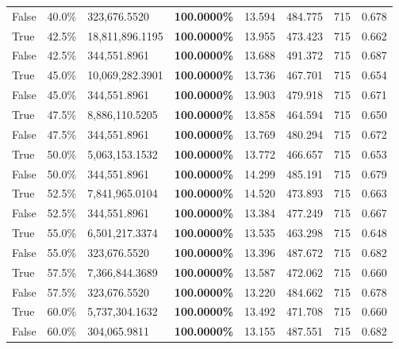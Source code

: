 \begin{table}[H]
\begin{tabular}{lllrllll}
\cline{1-8}
False & 40.0\% & 323,676.5520 & \bfseries \color{red} 100.0000\% & 13.594 & 484.775 & 715 & 0.678 \\
\cline{1-8}
True & 42.5\% & 18,811,896.1195 & \bfseries \color{red} 100.0000\% & 13.955 & 473.423 & 715 & 0.662 \\
\cline{1-8}
False & 42.5\% & 344,551.8961 & \bfseries \color{red} 100.0000\% & 13.688 & 491.372 & 715 & 0.687 \\
\cline{1-8}
True & 45.0\% & 10,069,282.3901 & \bfseries \color{red} 100.0000\% & 13.736 & 467.701 & 715 & 0.654 \\
\cline{1-8}
False & 45.0\% & 344,551.8961 & \bfseries \color{red} 100.0000\% & 13.903 & 479.918 & 715 & 0.671 \\
\cline{1-8}
True & 47.5\% & 8,886,110.5205 & \bfseries \color{red} 100.0000\% & 13.858 & 464.594 & 715 & 0.650 \\
\cline{1-8}
False & 47.5\% & 344,551.8961 & \bfseries \color{red} 100.0000\% & 13.769 & 480.294 & 715 & 0.672 \\
\cline{1-8}
True & 50.0\% & 5,063,153.1532 & \bfseries \color{red} 100.0000\% & 13.772 & 466.657 & 715 & 0.653 \\
\cline{1-8}
False & 50.0\% & 344,551.8961 & \bfseries \color{red} 100.0000\% & 14.299 & 485.191 & 715 & 0.679 \\
\cline{1-8}
True & 52.5\% & 7,841,965.0104 & \bfseries \color{red} 100.0000\% & 14.520 & 473.893 & 715 & 0.663 \\
\cline{1-8}
False & 52.5\% & 344,551.8961 & \bfseries \color{red} 100.0000\% & 13.384 & 477.249 & 715 & 0.667 \\
\cline{1-8}
True & 55.0\% & 6,501,217.3374 & \bfseries \color{red} 100.0000\% & 13.535 & 463.298 & 715 & 0.648 \\
\cline{1-8}
False & 55.0\% & 323,676.5520 & \bfseries \color{red} 100.0000\% & 13.396 & 487.672 & 715 & 0.682 \\
\cline{1-8}
True & 57.5\% & 7,366,844.3689 & \bfseries \color{red} 100.0000\% & 13.587 & 472.062 & 715 & 0.660 \\
\cline{1-8}
False & 57.5\% & 323,676.5520 & \bfseries \color{red} 100.0000\% & 13.220 & 484.662 & 715 & 0.678 \\
\cline{1-8}
True & 60.0\% & 5,737,304.1632 & \bfseries \color{red} 100.0000\% & 13.492 & 471.708 & 715 & 0.660 \\
\cline{1-8}
False & 60.0\% & \color{red} 304,065.9811 & \bfseries \color{red} 100.0000\% & 13.155 & 487.551 & 715 & 0.682 \\

\end{tabular}
\end{table}
